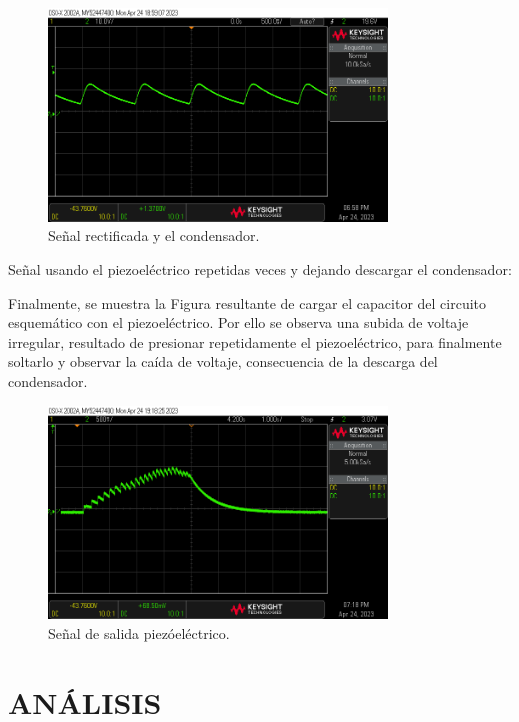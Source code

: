 \documentclass[journal,transmag]{IEEEtran}
\begin{document}
\begin{figure}[!h]
    \center
    \includegraphics[width=9cm]{imgs/s4.png}
    \caption{Señal rectificada y el condensador.}
    \label{2}
\end{figure}

Señal usando el piezoeléctrico repetidas veces y dejando descargar el condensador: 

Finalmente, se muestra la Figura resultante de cargar el capacitor del circuito esquemático con el piezoeléctrico. Por ello se observa una subida de voltaje irregular, resultado de presionar repetidamente el piezoeléctrico, para finalmente soltarlo y observar la caída de voltaje, consecuencia de la descarga del condensador. 

\begin{figure}[!h]
    \center
    \includegraphics[width=9cm]{imgs/s5.png}
    \caption{Señal de salida piezóeléctrico.}
    \label{2}
\end{figure}
  
\section{ANÁLISIS}
\end{document}
